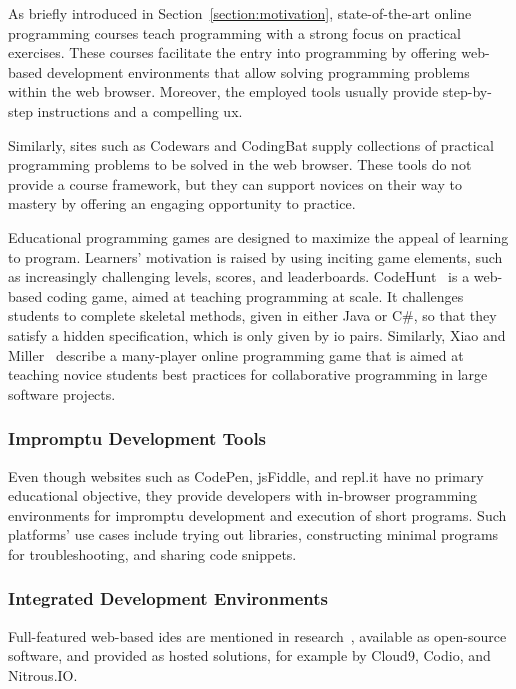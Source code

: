 As briefly introduced in Section~\ref{section:motivation}, state-of-the-art online programming courses teach programming with a strong focus on practical exercises. These courses facilitate the entry into programming by offering web-based development environments that allow solving programming problems within the web browser. Moreover, the employed tools usually provide step-by-step instructions and a compelling \gls{ux}.

Similarly, sites such as Codewars and CodingBat supply collections of practical programming problems to be solved in the web browser. These tools do not provide a course framework, but they can support novices on their way to mastery by offering an engaging opportunity to practice.

Educational programming games are designed to maximize the appeal of learning to program. Learners' motivation is raised by using inciting game elements, such as increasingly challenging levels, scores, and leaderboards. CodeHunt~\cite{tillmann2014codehunt} is a web-based coding game, aimed at teaching programming at scale. It challenges students to complete skeletal methods, given in either Java or C\#, so that they satisfy a hidden specification, which is only given by \gls{io} pairs. Similarly, Xiao and Miller~\cite{xiao2014multiplayer} describe a many-player online programming game that is aimed at teaching novice \cs students best practices for collaborative programming in large software projects.

\subsubsection{Impromptu Development Tools}

Even though websites such as CodePen, jsFiddle, and repl.it have no primary educational objective, they provide developers with in-browser programming environments for impromptu development and execution of short programs. Such platforms' use cases include trying out libraries, constructing minimal programs for troubleshooting, and sharing code snippets.

\subsubsection{Integrated Development Environments}

Full-featured web-based \glspl{ide} are mentioned in research~\cite{aho2011designing,goldman2011real,wang2014educational,wu2011ceclipse}, available as open-source software, and provided as hosted solutions, for example by Cloud9, Codio, and Nitrous.IO.

